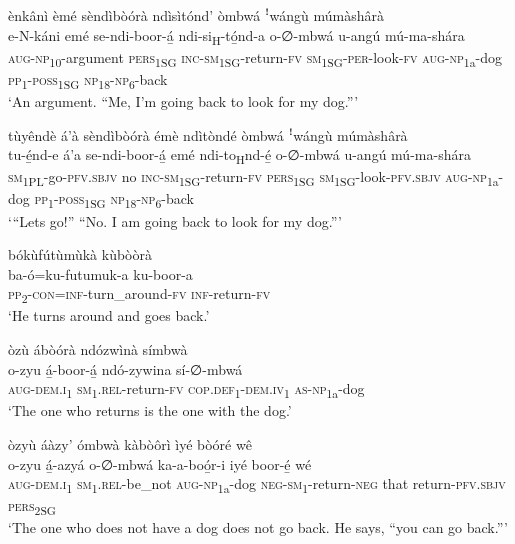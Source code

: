 ènkânì èmé sèndìbòórà ndìsìtónd’ òmbwá ꜝwángù múmàshârà\\
\gll e-N-káni      emé    se-ndi-boor-á̲ ndi-si\textsubscript{H}{}-tó̲nd-a  o-∅-mbwá     u-angú  mú-ma-shára\\
\textsc{aug}{}-\textsc{np}\textsubscript{10}{}-argument  \textsc{pers}\textsubscript{1SG} \textsc{inc}{}-\textsc{sm}\textsubscript{1SG}{}-return-\textsc{fv}
\textsc{sm}\textsubscript{1SG}{}-\textsc{per}{}-look-\textsc{fv}  \textsc{aug}{}-\textsc{np}\textsubscript{1a}{}-dog  \textsc{pp}\textsubscript{1}{}-\textsc{poss}\textsubscript{1SG}  \textsc{np}\textsubscript{18}{}-\textsc{np}\textsubscript{6}{}-back\\
\glt ‘An argument. “Me, I’m going back to look for my dog.”’\bigskip

tùyêndè á’à sèndìbòórà émè ndìtòndé òmbwá ꜝwángù múmàshârà\\
\gll tu-é̲nd-e    á’a  se-ndi-boor-á̲    emé ndi-to\textsubscript{H}nd-é̲    o-∅-mbwá    u-angú  mú-ma-shára \\
\textsc{sm}\-\textsubscript{1PL}{}-go-\textsc{pfv}.\textsc{sbjv}  no  \textsc{inc}{}-\textsc{sm}\textsubscript{1SG}{}-return-\textsc{fv}    \textsc{pers}\textsubscript{1SG}
\textsc{sm}\textsubscript{1SG}{}-look-\textsc{pfv}.\textsc{sbjv}  \textsc{aug}{}-\textsc{np}\textsubscript{1a}{}-dog  \textsc{pp}\textsubscript{1}{}-\textsc{poss}\textsubscript{1SG}  \textsc{np}\textsubscript{18}{}-\textsc{np}\textsubscript{6}{}-back\\
\glt ‘“Lets go!” “No. I am going back to look for my dog.”’\bigskip

bókùfútùmùkà kùbòòrà\\
\gll ba-ó=ku-futumuk-a      ku-boor-a\\
\textsc{pp}\textsubscript{2}{}-\textsc{con}=\textsc{inf}{}-turn\_around-\textsc{fv}  \textsc{inf}{}-return-\textsc{fv}\\
\glt ‘He turns around and goes back.’\bigskip

òzù ábòórà ndózwìnà símbwà\\
\gll o-zyu    á̲-boor-á̲    ndó-zywina    sí-∅-mbwá\\
\textsc{aug}{}-\textsc{dem}.\textsc{i}\textsubscript{1}  \textsc{sm}\textsubscript{1}.\textsc{rel}{}-return-\textsc{fv}  \textsc{cop}.\textsc{def}\textsubscript{1}{}-\textsc{dem}.\textsc{iv}\textsubscript{1}  \textsc{as}{}-\textsc{np}\textsubscript{1a}{}-dog\\
\glt ‘The one who returns is the one with the dog.’\bigskip

òzyù áàzy’ ómbwà kàbòôrì ìyé bòóré wê\\
\gll o-zyu    á̲-azyá      o-∅-mbwá ka-a-boó̲r-i      iyé  boor-é̲    wé \\
\textsc{aug}{}-\textsc{dem}.\textsc{i}\textsubscript{1}  \textsc{sm}\textsubscript{1}.\textsc{rel}{}-be\_not  \textsc{aug}{}-\textsc{np}\textsubscript{1a}{}-dog
\textsc{neg}{}-\textsc{sm}\textsubscript{1}{}-return-\textsc{neg}  that  return-\textsc{pfv}.\textsc{sbjv}  \textsc{pers}\textsubscript{2SG}\\
\glt ‘The one who does not have a dog does not go back. He says, “you can go back.”’\bigskip

